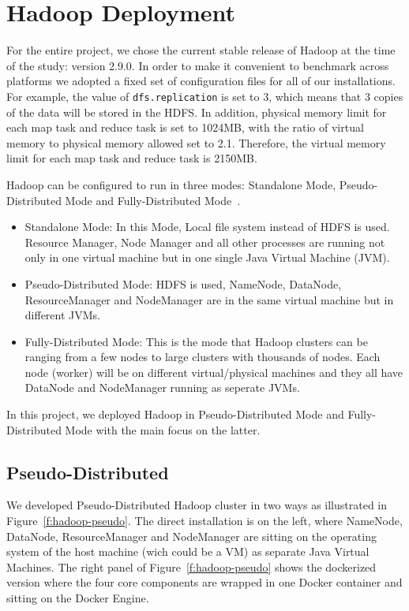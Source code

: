 \section{Hadoop Deployment}\label{s:hadoopdep}

For the entire project, we chose the current stable release of Hadoop
at the time of the study: version 2.9.0. In order to make it
convenient to benchmark across platforms we adopted a fixed set of
configuration files for all of our installations. For example, the
value of \verb|dfs.replication| is set to 3, which means that 3 copies of
the data will be stored in the HDFS. In addition, physical memory
limit for each map task and reduce task is set to 1024MB, with the
ratio of virtual memory to physical memory allowed set to
2.1. Therefore, the virtual memory limit for each map task and reduce
task is 2150MB.

Hadoop can be configured to run in three modes: Standalone Mode, 
Pseudo-Distributed Mode and Fully-Distributed 
Mode~\cite{hid-sp18-405-hadoop-singlenode}. 
\begin{itemize}
	\item Standalone Mode: In this Mode, Local file system instead of
        HDFS is used. Resource Manager, Node Manager and all other
        processes are running not only in one virtual machine but in one
        single Java Virtual Machine (JVM).
	\item Pseudo-Distributed Mode: HDFS is used, NameNode, DataNode, 
	ResourceManager and NodeManager are in the same virtual machine
        but in different JVMs. 
	\item Fully-Distributed Mode: This is the mode that Hadoop
        clusters can be ranging from a few nodes to large clusters with
        thousands of nodes. Each node (worker) will be on different
        virtual/physical machines and they all have DataNode and
        NodeManager running as seperate JVMs.
\end{itemize}
In this project, we deployed Hadoop in Pseudo-Distributed Mode and 
Fully-Distributed Mode with the main focus on the latter. 

\subsection{Pseudo-Distributed}\label{ss:pseudo-distributed}

We developed Pseudo-Distributed Hadoop cluster in two ways as
illustrated in Figure~\ref{f:hadoop-pseudo}. The direct installation
is on the left, where NameNode, DataNode, ResourceManager and
NodeManager are sitting on the operating system of the host machine
(wich could be a VM) as separate Java Virtual Machines. The right
panel of Figure~\ref{f:hadoop-pseudo} shows the dockerized version
where the four core components are wrapped in one Docker container and
sitting on the Docker Engine.

